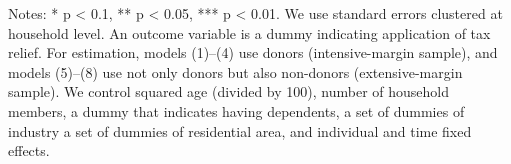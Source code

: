 \begin{landscape}
\begin{table}
\begin{threeparttable}
\begin{tablenotes}
\item Notes: * p < 0.1, ** p < 0.05, *** p < 0.01. We use standard errors clustered at household level. An outcome variable is a dummy indicating application of tax relief. For estimation, models (1)--(4) use donors (intensive-margin sample), and models (5)--(8) use not only donors but also non-donors (extensive-margin sample).  We control squared age (divided by 100), number of household members, a dummy that indicates having dependents, a set of dummies of industry a set of dummies of residential area, and individual and time fixed effects.
\end{tablenotes}
\end{threeparttable}
\end{table}
\end{landscape}
